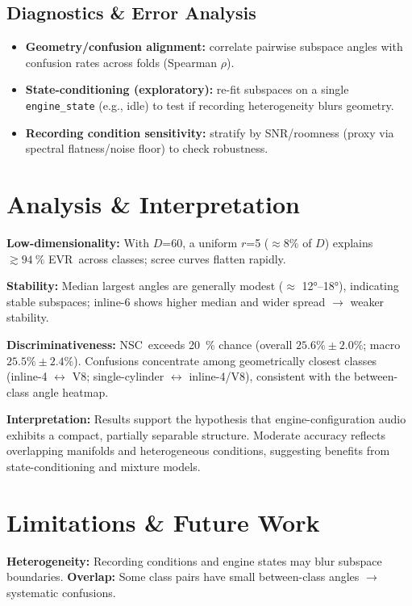 \documentclass[11pt]{article}
\newcommand{\D}{\ensuremath{D}\xspace}
\newcommand{\rankr}{\ensuremath{r}\xspace}
\newcommand{\EVR}{EVR\xspace}
\newcommand{\NSC}{NSC\xspace}
\begin{document}
\subsection{Diagnostics \& Error Analysis}
\begin{itemize}
\item \textbf{Geometry/confusion alignment:} correlate pairwise subspace angles with confusion rates across folds (Spearman $\rho$).
\item \textbf{State-conditioning (exploratory):} re-fit subspaces on a single \texttt{engine\_state} (e.g., idle) to test if recording heterogeneity blurs geometry.
\item \textbf{Recording condition sensitivity:} stratify by SNR/roomness (proxy via spectral flatness/noise floor) to check robustness.
\end{itemize}

\section{Analysis \& Interpretation}

\textbf{Low-dimensionality:} With \D=60, a uniform \rankr=5 ($\approx 8\%$ of \D) explains $\gtrsim \SI{94}{\percent}$ \EVR\ across classes; scree curves flatten rapidly.

\textbf{Stability:} Median largest angles are generally modest ($\approx$ \ang{12}--\ang{18}), indicating stable subspaces; inline-6 shows higher median and wider spread $\rightarrow$ weaker stability.

\textbf{Discriminativeness:} \NSC\ exceeds \SI{20}{\percent} chance (overall $25.6\% \pm 2.0\%$; macro $25.5\% \pm 2.4\%$). Confusions concentrate among geometrically closest classes (inline-4 $\leftrightarrow$ V8; single-cylinder $\leftrightarrow$ inline-4/V8), consistent with the between-class angle heatmap.

\textbf{Interpretation:} Results support the hypothesis that engine-configuration audio exhibits a compact, partially separable structure. Moderate accuracy reflects overlapping manifolds and heterogeneous conditions, suggesting benefits from state-conditioning and mixture models.

\section{Limitations \& Future Work}

\textbf{Heterogeneity:} Recording conditions and engine states may blur subspace boundaries. \textbf{Overlap:} Some class pairs have small between-class angles $\rightarrow$ systematic confusions.
\end{document}
